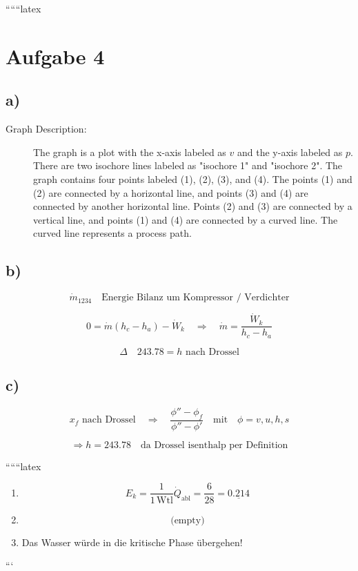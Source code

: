 
``````latex


\section*{Aufgabe 4}

\subsection*{a)}

\begin{description}
    \item[Graph Description:] The graph is a plot with the x-axis labeled as $v$ and the y-axis labeled as $p$. There are two isochore lines labeled as "isochore 1" and "isochore 2". The graph contains four points labeled (1), (2), (3), and (4). The points (1) and (2) are connected by a horizontal line, and points (3) and (4) are connected by another horizontal line. Points (2) and (3) are connected by a vertical line, and points (1) and (4) are connected by a curved line. The curved line represents a process path.
\end{description}

\subsection*{b)}

\[
\dot{m}_{1234} \quad \text{Energie Bilanz um Kompressor / Verdichter}
\]

\[
0 = \dot{m} (h_c - h_a) - \dot{W}_k \quad \Rightarrow \quad \dot{m} = \frac{\dot{W}_k}{h_c - h_a}
\]

\[
\Delta \quad 243.78 = h \text{ nach Drossel}
\]

\subsection*{c)}

\[
x_f \text{ nach Drossel} \quad \Rightarrow \quad \frac{\phi'' - \phi_f}{\phi'' - \phi'} \quad \text{mit} \quad \phi = v, u, h, s
\]

\[
\Rightarrow h = 243.78 \quad \text{da Drossel isenthalp per Definition}
\]

``````latex


\begin{enumerate}
    \item 
    \[
    E_k = \frac{1}{1 \, \text{Wtl}} \dot{Q}_{\text{abl}} = \frac{6}{28} = \underline{0.214}
    \]
    
    \item 
    \[
    \text{(empty)}
    \]
    
    \item 
    Das Wasser würde in die kritische Phase übergehen!
\end{enumerate}

```